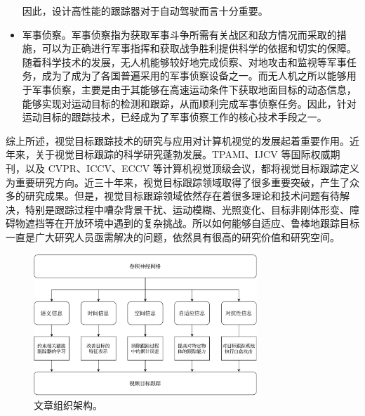 \begin{itemize}
因此，设计高性能的跟踪器对于自动驾驶而言十分重要。%
\item 军事侦察。军事侦察指为获取军事斗争所需有关战区和敌方情况而采取的措施，可以为正确进行军事指挥和获取战争胜利提供科学的依据和切实的保障。随着科学技术的发展，无人机能够较好地完成侦察、对地攻击和监视等军事任务，成为了成为了各国普遍采用的军事侦察设备之一。而无人机之所以能够用于军事侦察，主要是由于其能够在高速运动条件下获取地面目标的动态信息，能够实现对运动目标的检测和跟踪，从而顺利完成军事侦察任务。因此，针对运动目标的跟踪技术，已经成为了军事侦察工作的核心技术手段之一。
\end{itemize}

综上所述，视觉目标跟踪技术的研究与应用对计算机视觉的发展起着重要作用。近年来，关于视觉目标跟踪的科学研究蓬勃发展。TPAMI、IJCV 等国际权威期刊，以及 CVPR、ICCV、ECCV 等计算机视觉顶级会议，都将视觉目标跟踪定义为重要研究方向。近三十年来，视觉目标跟踪领域取得了很多重要突破，产生了众多的研究成果。但是，视觉目标跟踪领域依然存在着很多理论和技术问题有待解决，特别是跟踪过程中嘈杂背景干扰、运动模糊、光照变化、目标非刚体形变、障碍物遮挡等在开放环境中遇到的复杂挑战。所以如何能够自适应、鲁棒地跟踪目标一直是广大研究人员亟需解决的问题，依然具有很高的研究价值和研究空间。

\begin{figure}
\centering
\includegraphics[width=0.75\textwidth]{Img/paper_arch.pdf}
\caption{文章组织架构。}
\end{figure}

